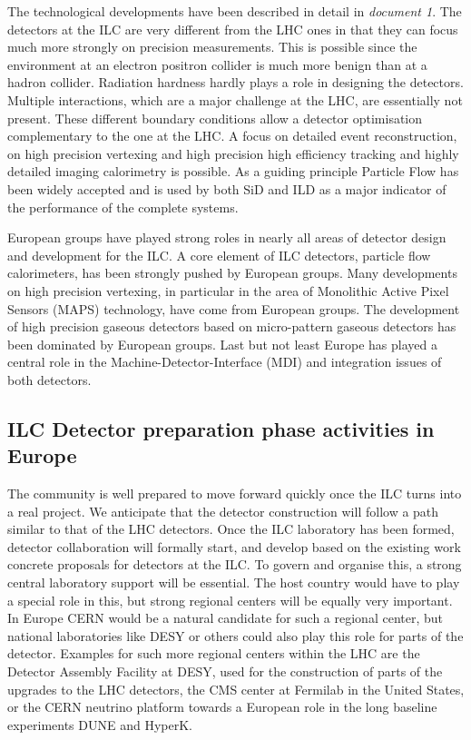 \documentclass[%
 reprint,
 amsmath,amssymb,
 aps,
]{revtex4-1}
\begin{document}
The technological developments have been described in detail in {\it document 1}. The detectors at the ILC are very different from the LHC ones in that they can focus much more strongly on precision measurements. This is possible since the environment at an electron positron collider is much more benign than at a hadron collider. Radiation hardness hardly plays a role in designing the detectors. Multiple interactions, which are a major challenge at the LHC, are essentially not present. These different boundary conditions allow a detector optimisation complementary to the one at the LHC. A focus on detailed event reconstruction, on high precision vertexing and high precision high efficiency tracking and highly detailed imaging calorimetry is possible. As a guiding principle Particle Flow has been widely accepted and is used by both SiD and ILD as a major indicator of the performance of the complete systems. 

European groups have played strong roles in nearly all areas of detector design and development for the ILC. A core element of ILC detectors, particle flow calorimeters, has been strongly pushed by European groups. Many developments on high precision vertexing, in particular in the area of Monolithic Active Pixel Sensors (MAPS) technology, have come from European groups. The development of high precision gaseous detectors based on micro-pattern gaseous detectors has been dominated by European groups. Last but not least Europe has played a central role in the Machine-Detector-Interface (MDI) and integration issues of both detectors.  

\subsection{ILC Detector preparation phase activities in Europe~\label{sec:prepphase:detectors}}
The community is well prepared to move forward quickly once the ILC turns into a real project. We anticipate that the detector construction will follow a path similar to that of the LHC detectors. Once the ILC laboratory has been formed, detector collaboration will formally start, and develop based on the existing work concrete proposals for detectors at the ILC. To govern and organise this, a strong central laboratory support will be essential. The host country would have to play a special role in this, but strong regional centers will be equally very important. In Europe CERN would be a natural candidate for such a regional center, but national laboratories like DESY or others could also play this role for parts of the detector. Examples for such more regional centers within the LHC are the Detector Assembly Facility at DESY, used for the construction of parts of the upgrades to the LHC detectors, the CMS center at Fermilab in the United States, or the CERN neutrino platform towards a European role in the long baseline experiments DUNE and HyperK. 
\end{document}
